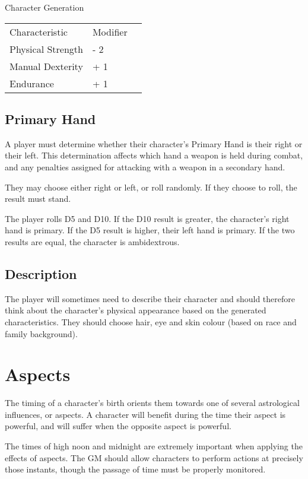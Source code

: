 \begin{Chapter}{Character Generation}
\begin{tabularx}{\columnwidth}{lll}
Characteristic		& Modifier \\
Physical Strength	& - 2 \\
Manual Dexterity	& + 1 \\
Endurance		& + 1 \\
\end{tabularx}

\subsection{Primary Hand}

A player must determine whether their character’s Primary Hand is
their right or their left.  This determination affects which hand a
weapon is held during combat, and any penalties assigned for attacking
with a weapon in a secondary hand.

They may choose either right or left, or roll randomly. If they choose
to roll, the result must stand.

The player rolls D5 and D10.  If the D10 result is greater, the
character’s right hand is primary. If the D5 result is higher, their
left hand is primary. If the two results are equal, the character is
ambidextrous.

\subsection{Description}

The player will sometimes need to describe their character and should
therefore think about the character’s physical appearance based on the
generated characteristics. They should choose hair, eye and skin
colour (based on race and family background).

\section{Aspects}
\label{aspects}

The timing of a character’s birth orients them towards one of several
astrological influences, or aspects.  A character will benefit during
the time their aspect is powerful, and will suffer when the opposite
aspect is powerful.

The times of high noon and midnight are extremely important when
applying the effects of aspects.  The GM should allow characters to
perform actions at precisely those instants, though the passage of
time must be properly monitored.


\end{Chapter}
